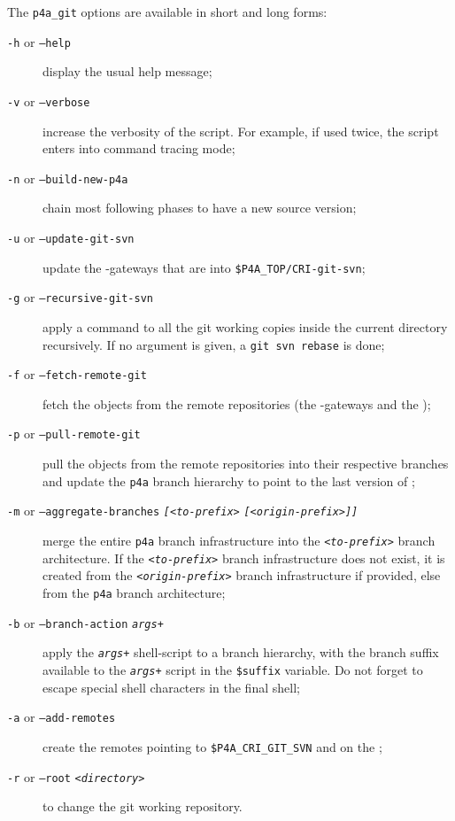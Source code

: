 \documentclass[a4paper]{article}
\begin{document}
The \verb|p4a_git| options are available in short and long forms:
\begin{description}
\item[\texttt{-h} or \texttt{--help}] display the usual help message;
\item[\texttt{-v} or \texttt{--verbose}] increase the verbosity of the
  script. For example, if used twice, the script enters into command
  tracing mode;
\item[\texttt{-n} or \texttt{--build-new-p4a}] chain most following phases
  to have a new \Apfa source version;
\item[\texttt{-u} or \texttt{--update-git-svn}] update the \Apips{}
  \Agit-\Asvn gateways that are into \verb|$P4A_TOP/CRI-git-svn|;%
\item[\texttt{-g} or \texttt{--recursive-git-svn}] apply a \Agit command
  to all the git working copies inside the current directory
  recursively. If no argument is given, a \texttt{git svn rebase} is done;
\item[\texttt{-f} or \texttt{--fetch-remote-git}] fetch the objects from
  the remote \Agit repositories (the \Apips{} \Agit-\Asvn gateways and the
  \Apolylib{} \Agit);
\item[\texttt{-p} or \texttt{--pull-remote-git}] pull the objects from the
  remote \Agit repositories into their respective branches and update the
  \texttt{p4a} branch hierarchy to point to the last version of \Apfa;
\item[\texttt{-m} or \texttt{--aggregate-branches}
  \texttt{\emph{[<to-prefix>}} \texttt{\emph{[<origin-prefix>]]}}] merge the
  entire \texttt{p4a} branch infrastructure into the
  \texttt{\emph{<to-prefix>}} branch architecture. If the
  \texttt{\emph{<to-prefix>}} branch infrastructure does not exist, it is
  created from the \texttt{\emph{<origin-prefix>}} branch infrastructure
  if provided, else from the \texttt{p4a} branch architecture;
\item[\texttt{-b} or \texttt{--branch-action} \texttt{\emph{args+}}] apply
  the \texttt{\emph{args+}} shell-script to a branch hierarchy, with the
  branch suffix available to the \texttt{\emph{args+}} script in the
  \verb|$suffix| variable. Do not forget to escape special shell
  characters in the final shell;
\item[\texttt{-a} or \texttt{--add-remotes}] create the remotes pointing
  to \verb|$P4A_CRI_GIT_SVN| and on the \Apolylib{} \Agit;
\item[\texttt{-r} or \texttt{--root} \texttt{<\emph{directory}>}] to
  change the git working repository.
\end{description}
\end{document}
